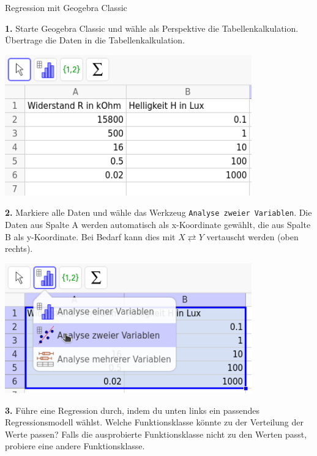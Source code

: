 \begin{zsfg}{Regression mit Geogebra Classic}
	
	\smallskip
	\begin{minipage}[c][4cm][t]{0.48\textwidth}
		\textbf{1.} Starte Geogebra Classic und wähle als Perspektive die Tabellenkalkulation. Übertrage die Daten in die Tabellenkalkulation.
	\end{minipage}
	\hfill
	\begin{minipage}[c][4cm][t]{0.48\textwidth}
		\centering
		\includegraphics[width=0.8\textwidth]{./pics/RegressionLDR-GGB-1.png}
	\end{minipage}
	
	
	\begin{minipage}[c][4cm][t]{0.48\textwidth}
		\textbf{2.}  Markiere alle Daten und wähle das Werkzeug \texttt{Analyse zweier Variablen}. Die Daten aus Spalte A werden automatisch als x-Koordinate gewählt, die aus Spalte B als y-Koordinate. Bei Bedarf kann dies mit $X \rightleftarrows Y$ vertauscht werden (oben rechts).
	\end{minipage}
	\hfill
	\begin{minipage}[c][4cm][t]{0.48\textwidth}
		\centering
		\includegraphics[width=0.8\textwidth]{./pics/RegressionLDR-GGB-2.png}
	\end{minipage}
	
	\begin{minipage}[c][7.5cm][t]{0.48\textwidth}
		\textbf{3.} Führe eine Regression durch, indem du unten links ein passendes Regressionsmodell wählst. Welche Funktionsklasse könnte zu der Verteilung der Werte passen? Falls die ausprobierte Funktionsklasse nicht zu den Werten passt, probiere eine andere Funktionsklasse.
		

\end{minipage}
\end{zsfg}
